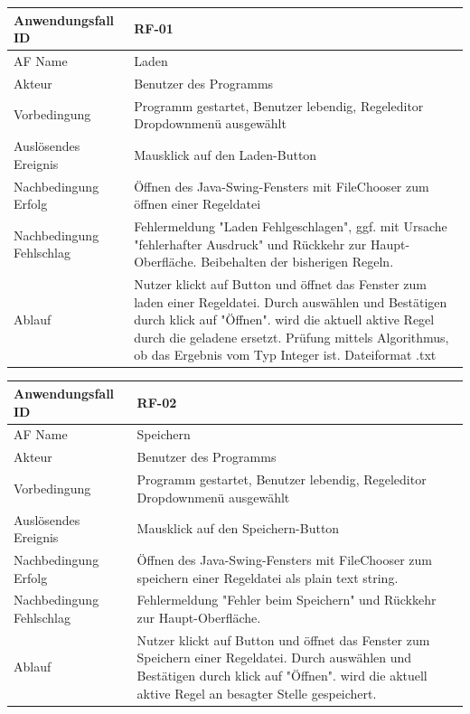 \documentclass[11pt,a4paper]{article}
\begin{document}
	\begin{tabular}[m]{|m{7cm}|m{9cm}|}
		\hline
		Anwendungsfall ID     & RF-01 \\ %
		\hline
		AF Name     &  Laden \\
		\hline
		Akteur&Benutzer des Programms \\
		\hline
		Vorbedingung&Programm gestartet, Benutzer lebendig, Regeleditor Dropdownmenü ausgewählt\\
		\hline
		Auslösendes Ereignis&Mausklick auf den Laden-Button\\
		\hline
		Nachbedingung Erfolg&Öffnen des Java-Swing-Fensters mit FileChooser zum öffnen einer Regeldatei\\
		\hline
		Nachbedingung Fehlschlag&Fehlermeldung "Laden Fehlgeschlagen", ggf. mit Ursache "fehlerhafter Ausdruck" und Rückkehr zur Haupt-Oberfläche. Beibehalten der bisherigen Regeln.\\
		\hline
		Ablauf&Nutzer klickt auf Button und öffnet das Fenster zum laden einer Regeldatei. Durch auswählen und Bestätigen durch klick auf "Öffnen". wird die aktuell aktive Regel durch die geladene ersetzt.
          Prüfung mittels Algorithmus, ob das Ergebnis vom Typ Integer ist. Dateiformat .txt\\
		\hline
	\end{tabular}
	\par
	
	\begin{tabular}[m]{|m{7cm}|m{9cm}|}
		\hline
		Anwendungsfall ID     & RF-02 \\ %
		\hline
		AF Name     &  Speichern \\
		\hline
		Akteur&Benutzer des Programms \\
		\hline
		Vorbedingung&Programm gestartet, Benutzer lebendig, Regeleditor Dropdownmenü ausgewählt\\
		\hline
		Auslösendes Ereignis&Mausklick auf den Speichern-Button\\
		\hline
		Nachbedingung Erfolg&Öffnen des Java-Swing-Fensters mit FileChooser zum speichern einer Regeldatei als plain text string.\\
		\hline
		Nachbedingung Fehlschlag&Fehlermeldung "Fehler beim Speichern" und Rückkehr zur Haupt-Oberfläche.\\
		\hline
		Ablauf&Nutzer klickt auf Button und öffnet das Fenster zum Speichern einer Regeldatei. Durch auswählen und Bestätigen durch klick auf "Öffnen". wird die aktuell aktive Regel an besagter Stelle gespeichert.\\
		\hline
	\end{tabular}
	\par
\end{document}
